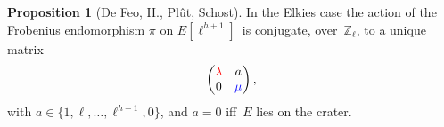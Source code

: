 \documentclass[10pt,a4paper]{beamer}
\theoremstyle{plain}
\theoremstyle{definition}
\theoremstyle{definition}
\theoremstyle{definition}
\newtheorem{prop}[thm]{Proposition}
\theoremstyle{definition}
\theoremstyle{remark}
\theoremstyle{remark}
\begin{document}
\begin{frame}

\begin{prop}[De Feo, H., Pl\^ut, Schost]\label{prop:matrice-Frobenius}
In the Elkies case the action of the Frobenius endomorphism $\pi$ on $E[\ell^{h+1}]$~is conjugate, over~$\mathbb{Z}_{\ell}$,
to a unique matrix \[\left ( \begin{matrix}{\color{red}\lambda} & a\\ 0 &
{\color{blue}\mu} \end{matrix}\right ), \]  with $a \in \{ 1,\ell, \dots,
\ell^{h-1}, 0  \}$, and $a = 0$ iff~$E$ lies on the crater.

\end{prop}

\begin{figure}
\begin{center}


\end{center}
\end{figure}
\end{frame}
\end{document}
